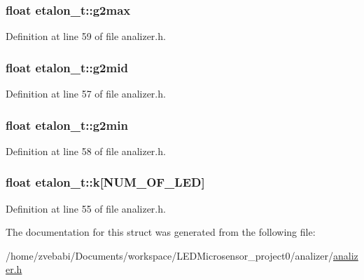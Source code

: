 \hypertarget{structetalon__t_aa305307c0910629f044451f2ffcf8f5e}{
\subsubsection[{g2max}]{\setlength{\rightskip}{0pt plus 5cm}float etalon\+\_\+t\+::g2max}}\label{structetalon__t_aa305307c0910629f044451f2ffcf8f5e}


Definition at line 59 of file analizer.\+h.

\hypertarget{structetalon__t_ab1abc2cac2f88d6e47df1ded10ce0837}{
\subsubsection[{g2mid}]{\setlength{\rightskip}{0pt plus 5cm}float etalon\+\_\+t\+::g2mid}}\label{structetalon__t_ab1abc2cac2f88d6e47df1ded10ce0837}


Definition at line 57 of file analizer.\+h.

\hypertarget{structetalon__t_a1b997b8d360ed62c4b49d5d30e53f64b}{
\subsubsection[{g2min}]{\setlength{\rightskip}{0pt plus 5cm}float etalon\+\_\+t\+::g2min}}\label{structetalon__t_a1b997b8d360ed62c4b49d5d30e53f64b}


Definition at line 58 of file analizer.\+h.

\hypertarget{structetalon__t_a70cad7a56e0aaeb8998957d09cf99599}{
\subsubsection[{k}]{\setlength{\rightskip}{0pt plus 5cm}float etalon\+\_\+t\+::k\mbox{[}{\bf N\+U\+M\+\_\+\+O\+F\+\_\+\+L\+E\+D}\mbox{]}}}\label{structetalon__t_a70cad7a56e0aaeb8998957d09cf99599}


Definition at line 55 of file analizer.\+h.



The documentation for this struct was generated from the following file\+:\begin{DoxyCompactItemize}
\item 
/home/zvebabi/\+Documents/workspace/\+L\+E\+D\+Microsensor\+\_\+project0/analizer/\hyperlink{analizer_8h}{analizer.\+h}\end{DoxyCompactItemize}

